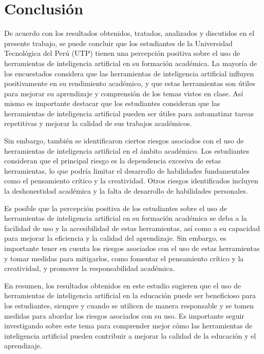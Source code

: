 \section{Conclusión}

  De acuerdo con los resultados obtenidos, tratados, analizados y discutidos en el presente trabajo, se puede concluir que los estudiantes de la Universidad Tecnológica del Perú (UTP) tienen una percepción positiva sobre el uso de herramientas de inteligencia artificial en su formación académica. La mayoría de los encuestados considera que las herramientas de inteligencia artificial influyen positivamente en su rendimiento académico, y que estas herramientas son útiles para mejorar su aprendizaje y comprensión de los temas vistos en clase. Así mismo es importante destacar que los estudiantes consideran que las herramientas de inteligencia artificial pueden ser útiles para automatizar tareas repetitivas y mejorar la calidad de sus trabajos académicos.

  Sin embargo, también se identificaron ciertos riesgos asociados con el uso de herramientas de inteligencia artificial en el ámbito académico. Los estudiantes consideran que el principal riesgo es la dependencia excesiva de estas herramientas, lo que podría limitar el desarrollo de habilidades fundamentales como el pensamiento crítico y la creatividad. Otros riesgos identificados incluyen la deshonestidad académica y la falta de desarrollo de habilidades personales.

  Es posible que la percepción positiva de los estudiantes sobre el uso de herramientas de inteligencia artificial en su formación académica se deba a la facilidad de uso y la accesibilidad de estas herramientas, así como a su capacidad para mejorar la eficiencia y la calidad del aprendizaje. Sin embargo, es importante tener en cuenta los riesgos asociados con el uso de estas herramientas y tomar medidas para mitigarlos, como fomentar el pensamiento crítico y la creatividad, y promover la responsabilidad académica.

  En resumen, los resultados obtenidos en este estudio sugieren que el uso de herramientas de inteligencia artificial en la educación puede ser beneficioso para los estudiantes, siempre y cuando se utilicen de manera responsable y se tomen medidas para abordar los riesgos asociados con su uso. Es importante seguir investigando sobre este tema para comprender mejor cómo las herramientas de inteligencia artificial pueden contribuir a mejorar la calidad de la educación y el aprendizaje.